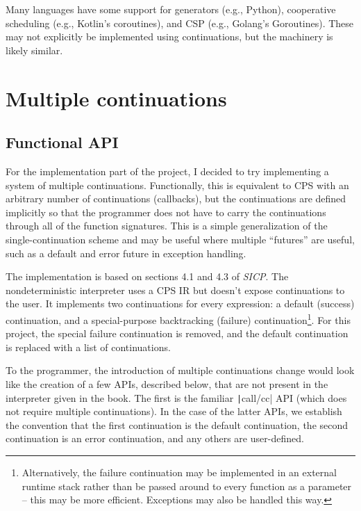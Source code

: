 \documentclass[]{article}
\begin{document}
Many languages have some support for generators (e.g., Python), cooperative scheduling (e.g., Kotlin's coroutines), and CSP (e.g., Golang's Goroutines). These may not explicitly be implemented using continuations, but the machinery is likely similar.

\section{Multiple continuations}
\label{sec:mulc}

\subsection{Functional API}
\label{sec:func}

For the implementation part of the project, I decided to try implementing a system of multiple continuations. Functionally, this is equivalent to CPS with an arbitrary number of continuations (callbacks), but the continuations are defined implicitly so that the programmer does not have to carry the continuations through all of the function signatures. This is a simple generalization of the single-continuation scheme and may be useful where multiple ``futures'' are useful, such as a default and error future in exception handling.

The implementation is based on sections 4.1 and 4.3 of \textit{SICP}. The nondeterministic interpreter uses a CPS IR but doesn't expose continuations to the user. It implements two continuations for every expression: a default (success) continuation, and a special-purpose backtracking (failure) continuation\footnote{Alternatively, the failure continuation may be implemented in an external runtime stack rather than be passed around to every function as a parameter -- this may be more efficient. Exceptions may also be handled this way.}. For this project, the special failure continuation is removed, and the default continuation is replaced with a list of continuations.

To the programmer, the introduction of multiple continuations change would look like the creation of a few APIs, described below, that are not present in the interpreter given in the book. The first is the familiar \texttt|call/cc| API (which does not require multiple continuations). In the case of the latter APIs, we establish the convention that the first continuation is the default continuation, the second continuation is an error continuation, and any others are user-defined.
\end{document}
